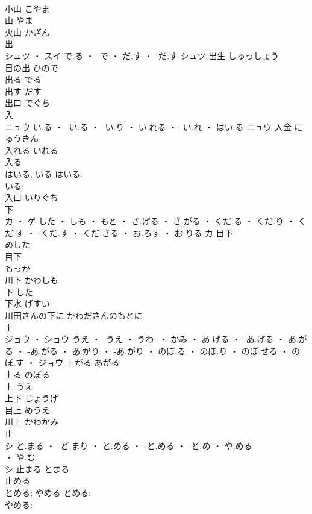 \documentclass[8pt]{extreport}
\begin{document}
\begin{CJK}{UTF8}{min}
\\	小山	こやま	
\\	山	やま	
\\	火山	かざん	
\\	出	
\\	シュツ ・ スイ	で.る ・ -で ・ だ.す ・ -だ.す	シュツ	出生	しゅっしょう	
\\	日の出	ひので	
\\	出る	でる	
\\	出す	だす	
\\	出口	でぐち	
\\	入	
\\	ニュウ	い.る ・ -い.る ・ -い.り ・ い.れる ・ -い.れ ・ はい.る	ニュウ	入金	にゅうきん	
\\	入れる	いれる	
\\	入る 
\\	はいる; いる	はいる: 
\\	いる: 
\\	入口	いりぐち	
\\	下	
\\	カ ・ ゲ	した ・ しも ・ もと ・ さ.げる ・ さ.がる ・ くだ.る ・ くだ.り ・ くだ.す ・ -くだ.す ・ くだ.さる ・ お.ろす ・ お.りる	カ	目下 
\\	めした	
\\	目下 
\\	もっか	
\\	川下	かわしも	
\\	下	した	
\\	下水	げすい	
\\	川田さんの下に	かわださんのもとに	
\\	上	
\\	ジョウ ・ ショウ	うえ ・ -うえ ・ うわ- ・ かみ ・ あ.げる ・ -あ.げる ・ あ.がる ・ -あ.がる ・ あ.がり ・ -あ.がり ・ のぼ.る ・ のぼ.り ・ のぼ.せる ・ のぼ.す ・	ジョウ	上がる	あがる	
\\	上る	のぼる	
\\	上	うえ	
\\	上下	じょうげ	
\\	目上	めうえ	
\\	川上	かわかみ	
\\	止	
\\	シ	と.まる ・ -ど.まり ・ と.める ・ -と.める ・ -ど.め ・ や.める
\\	・ や.む
\\	シ	止まる	とまる	
\\	止める 
\\	とめる; やめる	とめる: 
\\	やめる: 

\end{CJK}
\end{document}
